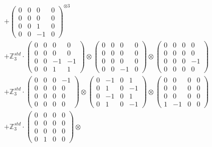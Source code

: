 \documentclass{article}
\begin{document}
{\begin{align}
        &+ \label{Rs16-Rc11-Solution-2-c16} \begin{pmatrix} 0 & 0 & 0 & 0 \\ 0 & 0 & 0 & 0 \\ 0 & 0 & 1 & 0 \\ 0 & 0 & -1 & 0 \end{pmatrix}^{\otimes 3} \\
        &+ \label{Rs16-Rc11-Solution-2-c17} \mathbb{Z}_3^{std} \cdot 
            \begin{pmatrix} 0 & 0 & 0 & 0 \\ 0 & 0 & 0 & 0 \\ 0 & 0 & -1 & -1 \\ 0 & 0 & 1 & 1 \end{pmatrix} \otimes 
            \begin{pmatrix} 0 & 0 & 0 & 0 \\ 0 & 0 & 0 & 0 \\ 0 & 0 & 0 & 0 \\ 0 & 0 & -1 & 0 \end{pmatrix} \otimes 
            \begin{pmatrix} 0 & 0 & 0 & 0 \\ 0 & 0 & 0 & 0 \\ 0 & 0 & 0 & -1 \\ 0 & 0 & 0 & 0 \end{pmatrix} \\ 
        &+ \label{Rs16-Rc11-Solution-2-c18} \mathbb{Z}_3^{std} \cdot 
            \begin{pmatrix} 0 & 0 & 0 & -1 \\ 0 & 0 & 0 & 0 \\ 0 & 0 & 0 & 0 \\ 0 & 0 & 0 & 0 \end{pmatrix} \otimes 
            \begin{pmatrix} 0 & -1 & 0 & 1 \\ 0 & 1 & 0 & -1 \\ 0 & -1 & 0 & 1 \\ 0 & 1 & 0 & -1 \end{pmatrix} \otimes 
            \begin{pmatrix} 0 & 0 & 0 & 0 \\ 0 & 0 & 0 & 0 \\ 0 & 0 & 0 & 0 \\ 1 & -1 & 0 & 0 \end{pmatrix} \\ 
        &+ \label{Rs16-Rc11-Solution-2-c19} \mathbb{Z}_3^{std} \cdot 
            \begin{pmatrix} 0 & 0 & 0 & 0 \\ 0 & 0 & 0 & 0 \\ 0 & 0 & 0 & 0 \\ 0 & 1 & 0 & 0 \end{pmatrix} \otimes 

\end{align}}
\end{document}
